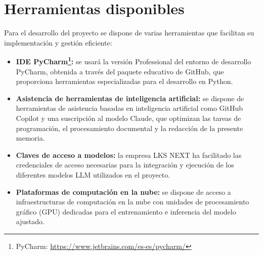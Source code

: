 \section{Herramientas disponibles}
Para el desarrollo del proyecto se dispone de varias herramientas que facilitan su implementación y gestión eficiente:
\begin{itemize}
\item\textbf{IDE PyCharm\footnote{PyCharm: \url{https://www.jetbrains.com/es-es/pycharm/}}: }se usará la versión Professional del entorno de desarrollo PyCharm, obtenida a través del paquete educativo de GitHub, que proporciona herramientas especializadas para el desarrollo en Python.
\item\textbf{Asistencia de herramientas de inteligencia artificial: }se dispone de herramientas de asistencia basadas en inteligencia artificial como GitHub Copilot y una suscripción al modelo Claude, que optimizan las tareas de programación, el procesamiento documental y la redacción de la presente memoria.
\item\textbf{Claves de acceso a modelos: }la empresa LKS NEXT ha facilitado las credenciales de acceso necesarias para la integración y ejecución de los diferentes modelos LLM utilizados en el proyecto.
\item\textbf{Plataformas de computación en la nube: }se dispone de acceso a infraestructuras de computación en la nube con unidades de procesamiento gráfico (GPU) dedicadas para el entrenamiento e inferencia del modelo ajustado.
\end{itemize}












